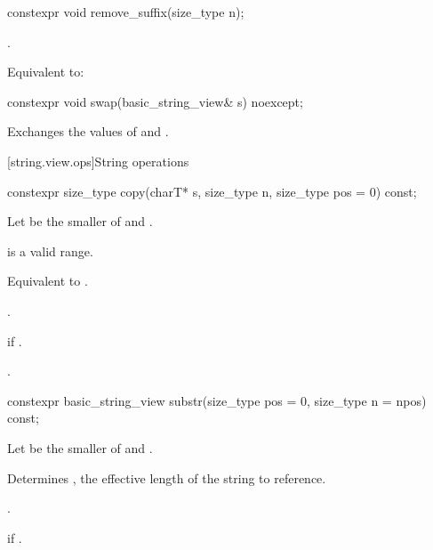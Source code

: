 %
\begin{itemdecl}
constexpr void remove_suffix(size_type n);
\end{itemdecl}

\begin{itemdescr}
\pnum
\expects
{}.

\pnum
\effects
Equivalent to: 
\end{itemdescr}

%
\begin{itemdecl}
constexpr void swap(basic_string_view& s) noexcept;
\end{itemdecl}

\begin{itemdescr}
\pnum
\effects
Exchanges the values of  and .
\end{itemdescr}

[string.view.ops]{String operations}

%
\begin{itemdecl}
constexpr size_type copy(charT* s, size_type n, size_type pos = 0) const;
\end{itemdecl}

\begin{itemdescr}
\pnum
Let  be the smaller of  and .

\pnum
\expects
{} is a valid range.

\pnum
\effects
Equivalent to .

\pnum
\returns
{}.

\pnum
\throws
{} if .

\pnum
\complexity
{}.
\end{itemdescr}

%
\begin{itemdecl}
constexpr basic_string_view substr(size_type pos = 0, size_type n = npos) const;
\end{itemdecl}

\begin{itemdescr}
\pnum
Let  be the smaller of  and .

\pnum
\effects
Determines , the effective length of the string to reference.

\pnum
\returns
{}.

\pnum
\throws
{} if .
\end{itemdescr}

